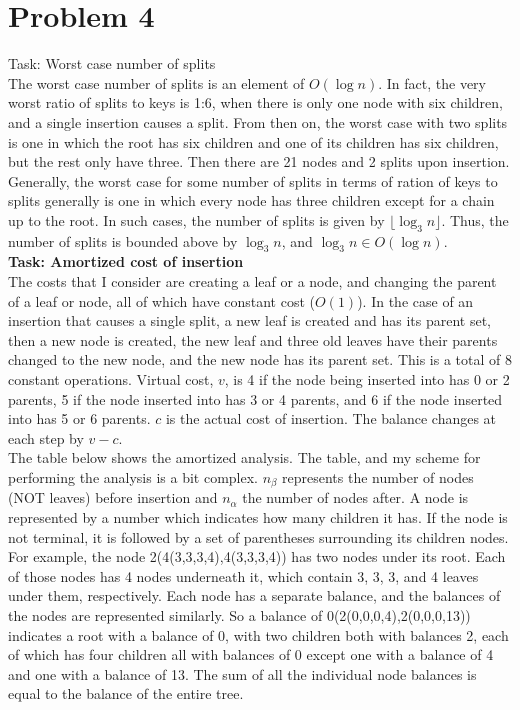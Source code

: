 \documentclass[12pt,letterpaper]{article}
\newcommand\hwnum{}                  %
\newenvironment{answer}[2]{
  \section*{Problem \hwnum#1}
}{\newpage}
\begin{document}
\begin{answer}{4}

\textbf{Task: Worst case number of splits}\\
The worst case number of splits is an element of $O(\log n)$. In fact, the very worst ratio of splits to keys is 1:6, when there is only one node with six children, and a single insertion causes a split. From then on, the worst case with two splits is one in which the root has six children and one of its children has six children, but the rest only have three. Then there are 21 nodes and 2 splits upon insertion. Generally, the worst case for some number of splits in terms of ration of keys to splits generally is one in which every node has three children except for a chain up to the root. In such cases, the number of splits is given by $\lfloor\log_3 n\rfloor$. Thus, the number of splits is bounded above by $\log_3 n$, and $\log_3 n \in O(\log n)$.\\


\textbf{Task: Amortized cost of insertion}\\
The costs that I consider are creating a leaf or a node, and changing the parent of a leaf or node, all of which have constant cost ($O(1)$). In the case of an insertion that causes a single split, a new leaf is created and has its parent set, then a new node is created, the new leaf and three old leaves have their parents changed to the new node, and the new node has its parent set. This is a total of 8 constant operations. Virtual cost, $v$, is 4 if the node being inserted into has 0 or 2 parents, 5 if the node inserted into has 3 or 4 parents, and 6 if the node inserted into has 5 or 6 parents. $c$ is the actual cost of insertion. The balance changes at each step by $v-c$.\\

The table below shows the amortized analysis. The table, and my scheme for performing the analysis is a bit complex. $n_\beta$ represents the number of nodes (NOT leaves) before insertion and $n_\alpha$ the number of nodes after. A node is represented by a number which indicates how many children it has. If the node is not terminal, it is followed by a set of parentheses surrounding its children nodes. For example, the node 2(4(3,3,3,4),4(3,3,3,4)) has two nodes under its root. Each of those nodes has 4 nodes underneath it, which contain 3, 3, 3, and 4 leaves under them, respectively. Each node has a separate balance, and the balances of the nodes are represented similarly. So a balance of 0(2(0,0,0,4),2(0,0,0,13)) indicates a root with a balance of 0, with two children both with balances 2, each of which has four children all with balances of 0 except one with a balance of 4 and one with a balance of 13. The sum of all the individual node balances is equal to the balance of the entire tree.\\


\end{answer}
\end{document}

